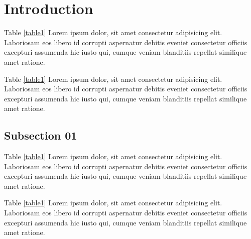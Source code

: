 \section{Introduction}
Table \ref{table1} Lorem ipsum dolor, sit amet consectetur adipisicing elit. Laboriosam eos libero id corrupti aspernatur debitis eveniet consectetur officiis excepturi assumenda hic iusto qui, cumque veniam blanditiis repellat similique amet ratione.

Table \ref{table1} Lorem ipsum dolor, sit amet consectetur adipisicing elit. Laboriosam eos libero id corrupti aspernatur debitis eveniet consectetur officiis excepturi assumenda hic iusto qui, cumque veniam blanditiis repellat similique amet ratione.

\subsection{Subsection 01}
Table \ref{table1} Lorem ipsum dolor, sit amet consectetur adipisicing elit. Laboriosam eos libero id corrupti aspernatur debitis eveniet consectetur officiis excepturi assumenda hic iusto qui, cumque veniam blanditiis repellat similique amet ratione.

Table \ref{table1} Lorem ipsum dolor, sit amet consectetur adipisicing elit. Laboriosam eos libero id corrupti aspernatur debitis eveniet consectetur officiis excepturi assumenda hic iusto qui, cumque veniam blanditiis repellat similique amet ratione.